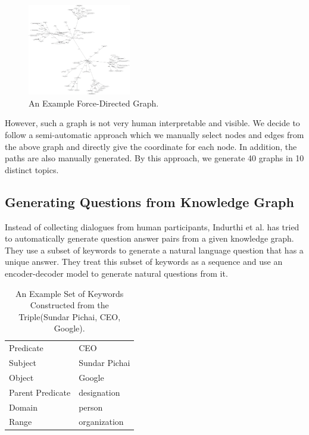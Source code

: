\documentclass[bsc,frontabs,twoside,singlespacing,parskip,deptreport]{infthesis}     %
\begin{document}
\begin{figure}[h]
    \centering
    \includegraphics[width=0.4\textwidth]{directed.png}
    \caption{An Example Force-Directed Graph.}
    \label{fig:obama}
\end{figure}

However, such a graph is not very human interpretable and visible. We decide to follow a semi-automatic approach which we manually select nodes and edges from the above graph and directly give the coordinate for each node. In addition, the paths are also manually generated. By this approach, we generate 40 graphs in 10 distinct topics.

\subsection{Generating Questions from Knowledge Graph}

Instead of collecting dialogues from human participants, Indurthi et al.\cite{indurthi2017generating} has tried to automatically generate question answer pairs from a given knowledge graph. They use a subset of keywords to generate a natural language question that has a unique answer. They treat this subset of keywords as a sequence and use an encoder-decoder model to generate natural questions from it.


\begin{table}[]
\centering
\begin{tabular}{|l|l|}
\hline
Predicate        & CEO           \\
Subject          & Sundar Pichai \\
Object           & Google        \\
Parent Predicate & designation   \\
Domain           & person        \\
Range            & organization  \\ \hline
\end{tabular}
\caption{An Example Set of Keywords Constructed from the Triple(Sundar Pichai, CEO, Google)\cite{indurthi2017generating}.}
\label{tab:keyword}
\end{table}
\end{document}
